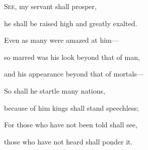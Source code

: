 \lettrine[lines=2]{S}{ee,} my servant shall prosper,\par
   he shall be raised high and greatly exalted.\par
\noindent Even as many were amazed at him—\par
   so marred was his look beyond that of man,\par
   and his appearance beyond that of mortals—\par
\noindent So shall he startle many nations,\par
   because of him kings shall stand speechless;\par
\noindent For those who have not been told shall see,\par
   those who have not heard shall ponder it.
